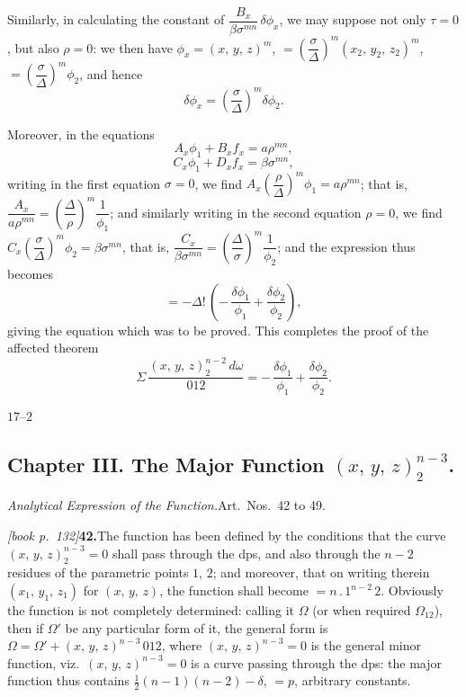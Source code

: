 \documentclass[11pt,a4paper]{article}
\theoremstyle{plain}
\theoremstyle{definition}
\theoremstyle{remark}
\begin{document}
Similarly, in calculating the constant of $\dfrac{B_x}{\beta\sigma^{mn}}\,\delta\phi_x$, we may suppose not only $\tau = 0$, but also $\rho = 0$: we then have $\phi_x = (x,\,y,\,z)^m$, $= \left(\dfrac{\sigma}{\Delta}\right)^m (x_2,\,y_2,\,z_2)^m$, $= \left(\dfrac{\sigma}{\Delta}\right)^m \phi_2$, and hence
\[
\delta\phi_x = \left(\frac{\sigma}{\Delta}\right)^m \delta\phi_2.
\]

Moreover, in the equations
\[
A_x\phi_1 + B_x f_x = a\rho^{mn},
\]
\[
C_x\phi_1 + D_x f_x = \beta\sigma^{mn},
\]
writing in the first equation $\sigma = 0$, we find $A_x\left(\dfrac{\rho}{\Delta}\right)^m \phi_1 = a\rho^{mn}$; that is, $\dfrac{A_x}{a\rho^{mn}} = \left(\dfrac{\Delta}{\rho}\right)^m \dfrac{1}{\phi_1}$; and similarly writing in the second equation $\rho = 0$, we find $C_x\left(\dfrac{\sigma}{\Delta}\right)^m \phi_2 = \beta\sigma^{mn}$, that is, $\dfrac{C_x}{\beta\sigma^{mn}} = \left(\dfrac{\Delta}{\sigma}\right)^m \dfrac{1}{\phi_2}$; and the expression thus becomes
\[
= -\Delta!\,\left(-\,\frac{\delta\phi_1}{\phi_1} + \frac{\delta\phi_2}{\phi_2}\right),
\]
giving the equation which was to be proved. This completes the proof of the affected theorem
\[
\Sigma\,\frac{(x,\,y,\,z)_2^{n-2}\,d\omega}{012} = -\,\frac{\delta\phi_1}{\phi_1} + \frac{\delta\phi_2}{\phi_2}.
\]

\hfill $17$--$2$

\subsection*{Chapter III. The Major Function $(x,\,y,\,z)_2^{n-3}$.}

\medskip\noindent\textit{Analytical Expression of the Function.}\quad Art.\ Nos.\ 42 to 49.

\medskip\noindent\textit{[book p.~132]}\quad \textbf{42.}\quad The function has been defined by the conditions that the curve $(x,\,y,\,z)_2^{n-3} = 0$ shall pass through the dps, and also through the $n - 2$ residues of the parametric points $1$, $2$; and moreover, that on writing therein $(x_1,\,y_1,\,z_1)$ for $(x,\,y,\,z)$, the function shall become $= n\,.\,1^{n-2}\,2$. Obviously the function is not completely determined: calling it $\Omega$ (or when required $\Omega_{12}$), then if $\Omega'$ be any particular form of it, the general form is $\Omega = \Omega' + (x,\,y,\,z)^{n-3}\,012$, where $(x,\,y,\,z)^{n-3} = 0$ is the general minor function, viz.\ $(x,\,y,\,z)^{n-3} = 0$ is a curve passing through the dps: the major function thus contains $\tfrac{1}{2}(n - 1)(n - 2) - \delta$, $= p$, arbitrary constants.
\end{document}
